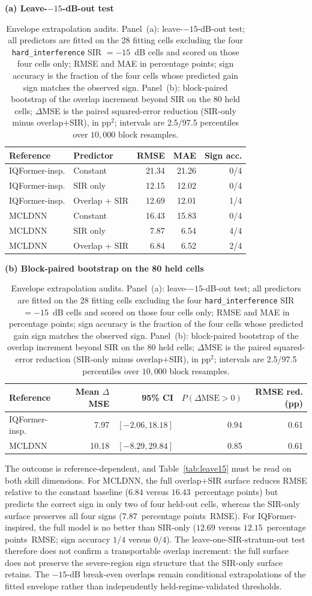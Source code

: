 \documentclass[letterpaper,onecolumn,11pt,journal]{IEEEtran}
\newcommand{\pp}{percentage points}
\begin{document}
\begin{table}[t]
\centering
\caption{Envelope extrapolation audits. Panel~(a): leave-$-15$-dB-out test;
all predictors are fitted on the 28 fitting cells excluding the four
\texttt{hard\_interference} SIR $=-15$~dB cells and scored on those four
cells only; RMSE and MAE in \pp; sign accuracy is the fraction of the four
cells whose predicted gain sign matches the observed sign. Panel~(b):
block-paired bootstrap of the overlap increment beyond SIR on the 80 held
cells; $\Delta$MSE is the paired squared-error reduction (SIR-only minus
overlap+SIR), in $\mathrm{pp}^2$; intervals are 2.5/97.5 percentiles over
$10{,}000$ block resamples.}
\label{tab:leave15}
\footnotesize
\setlength{\tabcolsep}{4pt}
\textbf{(a) Leave-$-15$-dB-out test}\\[2pt]
\begin{tabular}{llrrr}
\toprule
Reference & Predictor & RMSE & MAE & Sign acc.\\
\midrule
IQFormer-insp. & Constant & 21.34 & 21.26 & 0/4\\
IQFormer-insp. & SIR only & 12.15 & 12.02 & 0/4\\
IQFormer-insp. & Overlap + SIR & 12.69 & 12.01 & 1/4\\
\midrule
MCLDNN & Constant & 16.43 & 15.83 & 0/4\\
MCLDNN & SIR only & 7.87 & 6.54 & 4/4\\
MCLDNN & Overlap + SIR & 6.84 & 6.52 & 2/4\\
\bottomrule
\end{tabular}

\vspace{5pt}
\textbf{(b) Block-paired bootstrap on the 80 held cells}\\[2pt]
\begin{tabular}{lrrrr}
\toprule
Reference & Mean $\Delta$MSE & 95\% CI & $P(\Delta\mathrm{MSE}>0)$ & RMSE red. (pp)\\
\midrule
IQFormer-insp. & 7.97 & $[-2.06, 18.18]$ & 0.94 & 0.61\\
MCLDNN & 10.18 & $[-8.29, 29.84]$ & 0.85 & 0.61\\
\bottomrule
\end{tabular}
\label{tab:bootpair}
\end{table}

The outcome is reference-dependent, and Table~\ref{tab:leave15} must be read
on both skill dimensions. For MCLDNN, the full overlap+SIR surface reduces
RMSE relative to the constant baseline ($6.84$ versus $16.43$~\pp) but
predicts the correct sign in only two of four held-out cells, whereas the
SIR-only surface preserves all four signs ($7.87$~\pp\ RMSE). For
IQFormer-inspired, the full model is no better than SIR-only ($12.69$ versus
$12.15$~\pp\ RMSE; sign accuracy $1/4$ versus $0/4$). The
leave-one-SIR-stratum-out test therefore does not confirm a transportable
overlap increment: the full surface does not preserve the severe-region sign
structure that the SIR-only surface retains. The $-15$-dB break-even overlaps
remain conditional extrapolations of the fitted envelope rather than
independently held-regime-validated thresholds.
\end{document}
